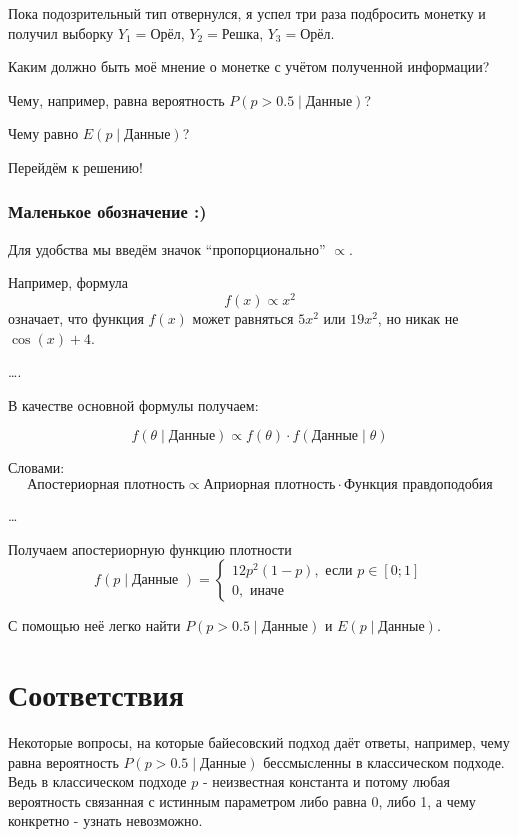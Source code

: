 \documentclass[11pt,russian,]{article}
\begin{document}
Пока подозрительный тип отвернулся, я успел три раза подбросить монетку
и получил выборку \(Y_1=\text{Орёл}\), \(Y_2=\text{Решка}\),
\(Y_3=\text{Орёл}\).

Каким должно быть моё мнение о монетке с учётом полученной информации?

Чему, например, равна вероятность \(P(p>0.5 \mid \text{Данные})\)?

Чему равно \(E(p \mid \text{Данные})\)?

Перейдём к решению!

\subsubsection{Маленькое обозначение :)}\label{-}

Для удобства мы введём значок ``пропорционально'' \(\propto\).

Например, формула \[
f(x) \propto x^2
\] означает, что функция \(f(x)\) может равняться \(5x^2\) или
\(19x^2\), но никак не \(\cos(x)+4\).

\ldots{}.

В качестве основной формулы получаем:

\[
f(\theta \mid \text{Данные}) \propto f(\theta) \cdot f(\text{Данные} \mid \theta)
\]

Словами: \[
\text{Апостериорная плотность} \propto \text{Априорная плотность} \cdot \text{Функция правдоподобия}
\]

\ldots{}

Получаем апостериорную функцию плотности \[
f(p \mid \text{Данные }) =
\begin{cases}
12p^2 (1-p), \text{ если } p \in [0;1] \\
0, \text{ иначе}
\end{cases}
\]

С помощью неё легко найти \(P(p>0.5 \mid \text{Данные})\) и
\(E(p \mid \text{Данные})\).

\section{Соответствия}

Некоторые вопросы, на которые байесовский подход даёт ответы, например,
чему равна вероятность \(P(p>0.5 \mid \text{Данные})\) бессмысленны в
классическом подходе. Ведь в классическом подходе \(p\) - неизвестная
константа и потому любая вероятность связанная с истинным параметром
либо равна 0, либо 1, а чему конкретно - узнать невозможно.
\end{document}
